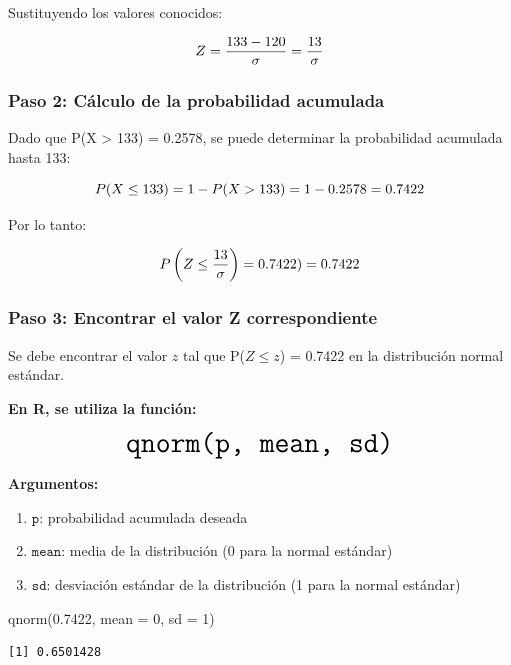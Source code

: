 \documentclass[
  spanish,
  letterpaper,
]{book}
\newenvironment{Shaded}{\begin{snugshade}}{\end{snugshade}}
\newcommand{\AttributeTok}[1]{\textcolor[rgb]{0.40,0.45,0.13}{#1}}
\newcommand{\DecValTok}[1]{\textcolor[rgb]{0.68,0.00,0.00}{#1}}
\newcommand{\FloatTok}[1]{\textcolor[rgb]{0.68,0.00,0.00}{#1}}
\newcommand{\FunctionTok}[1]{\textcolor[rgb]{0.28,0.35,0.67}{#1}}
\newcommand{\NormalTok}[1]{\textcolor[rgb]{0.00,0.23,0.31}{#1}}
\begin{document}
Sustituyendo los valores conocidos:

\[\LARGE Z = \frac{133 - 120}{\sigma} = \frac{13}{\sigma} \]

\subsubsection{Paso 2: Cálculo de la probabilidad
acumulada}\label{paso-2-cuxe1lculo-de-la-probabilidad-acumulada}

Dado que P(X \textgreater{} 133) = 0.2578, se puede determinar la
probabilidad acumulada hasta 133:

\[\Large P(X \leq 133) = 1 - P(X > 133) = 1 - 0.2578 = 0.7422 \]

Por lo tanto:

\[\Large P\left(Z \leq \frac{13}{\sigma}\right) = 0.7422 )=0.7422\]

\subsubsection{Paso 3: Encontrar el valor Z
correspondiente}\label{paso-3-encontrar-el-valor-z-correspondiente}

Se debe encontrar el valor \(z\) tal que P(\(Z \leq z\)) = 0.7422 en la
distribución normal estándar.

\textbf{En R, se utiliza la función:}

\[\huge \texttt{qnorm(p, mean, sd)} \]

\textbf{Argumentos:}

\begin{enumerate}
\def\labelenumi{\arabic{enumi}.}
\item
  \(\texttt{p}\): probabilidad acumulada deseada
\item
  \(\texttt{mean}\): media de la distribución (0 para la normal
  estándar)
\item
  \(\texttt{sd}\): desviación estándar de la distribución (1 para la
  normal estándar)
\end{enumerate}

\begin{Shaded}
\begin{Highlighting}[]
\FunctionTok{qnorm}\NormalTok{(}\FloatTok{0.7422}\NormalTok{, }\AttributeTok{mean =} \DecValTok{0}\NormalTok{, }\AttributeTok{sd =} \DecValTok{1}\NormalTok{)}
\end{Highlighting}
\end{Shaded}

\begin{verbatim}
[1] 0.6501428
\end{verbatim}
\end{document}
